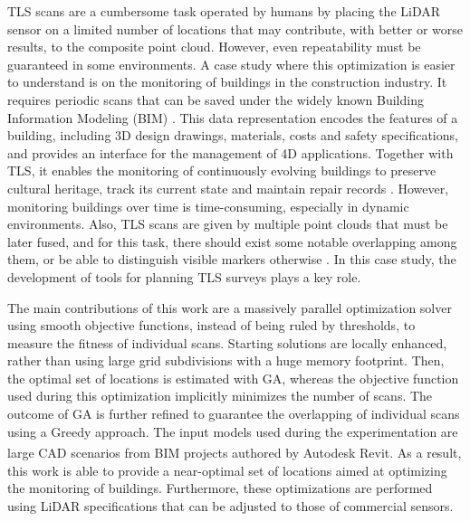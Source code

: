 \begin{kaobox}[frametitle=Case study of TLS optimization: Building Information Modelling]
TLS scans are a cumbersome task operated by humans by placing the LiDAR sensor on a limited number of locations that may contribute, with better or worse results, to the composite point cloud. However, even repeatability must be guaranteed in some environments. A case study where this optimization is easier to understand is on the monitoring of buildings in the construction industry. It requires periodic scans that can be saved under the widely known Building Information Modeling (BIM) \cite{macher_point_2017}. This data representation encodes the features of a building, including 3D design drawings, materials, costs and safety specifications, and provides an interface for the management of 4D applications. Together with TLS, it enables the monitoring of continuously evolving buildings to preserve cultural heritage, track its current state and maintain repair records \cite{rocha_scan--bim_2020, andriasyan_point_2020, moyano_bringing_2020, ham_phased_2020}. However, monitoring buildings over time is time-consuming, especially in dynamic environments. Also, TLS scans are given by multiple point clouds that must be later fused, and for this task, there should exist some notable overlapping among them, or be able to distinguish visible markers otherwise \cite{gollob_comparison_2020}. In this case study, the development of tools for planning TLS surveys plays a key role. 
\end{kaobox}

The main contributions of this work are a massively parallel optimization solver using smooth objective functions, instead of being ruled by thresholds, to measure the fitness of individual scans. Starting solutions are locally enhanced, rather than using large grid subdivisions with a huge memory footprint. Then, the optimal set of locations is estimated with GA, whereas the objective function used during this optimization implicitly minimizes the number of scans. The outcome of GA is further refined to guarantee the overlapping of individual scans using a Greedy approach. The input models used during the experimentation are large CAD scenarios from BIM projects authored by Autodesk Revit\textsuperscript{\textregistered}. As a result, this work is able to provide a near-optimal set of locations aimed at optimizing the monitoring of buildings. Furthermore, these optimizations are performed using LiDAR specifications that can be adjusted to those of commercial sensors. 

